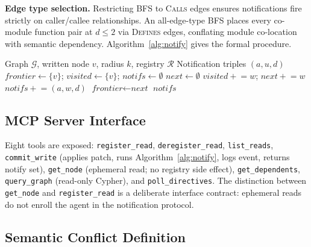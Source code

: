 \documentclass[12pt]{article}
\begin{document}
\noindent\textbf{Edge type selection.}
Restricting BFS to \textsc{Calls} edges ensures notifications fire strictly on
caller/callee relationships. An all-edge-type BFS places every co-module
function pair at $d \leq 2$ via \textsc{Defines} edges, conflating module
co-location with semantic dependency. Algorithm~\ref{alg:notify} gives the
formal procedure.

\begin{algorithm}[ht]
\caption{Write-Triggered Notification (\textsc{NotifyDependents})}
\label{alg:notify}
\small
\begin{algorithmic}[1]
\Require Graph $\mathcal{G}$, written node $v$, radius $k$, registry $\mathcal{R}$
\Ensure Notification triples $(a, u, d)$
\State $\textit{frontier} \leftarrow \{v\}$;\;
       $\textit{visited} \leftarrow \{v\}$;\;
       $\textit{notifs} \leftarrow \emptyset$
    \State $\textit{next} \leftarrow \emptyset$
            \State $\textit{visited} \mathrel{+}= w$;\; $\textit{next} \mathrel{+}= w$
                \State $\textit{notifs} \mathrel{+}= (a,w,d)$
            \EndFor
        \EndFor
    \EndFor
    \State $\textit{frontier} \leftarrow \textit{next}$
\EndFor
\State \Return $\textit{notifs}$
\end{algorithmic}
\end{algorithm}

\subsection{MCP Server Interface}

Eight tools are exposed: \texttt{register\_read}, \texttt{deregister\_read},
\texttt{list\_reads}, \texttt{commit\_write} (applies patch, runs
Algorithm~\ref{alg:notify}, logs event, returns notify set),
\texttt{get\_node} (ephemeral read; no registry side effect),
\texttt{get\_dependents}, \texttt{query\_graph} (read-only Cypher), and
\texttt{poll\_directives}. The distinction between \texttt{get\_node} and
\texttt{register\_read} is a deliberate interface contract: ephemeral reads
do not enroll the agent in the notification protocol.

\subsection{Semantic Conflict Definition}
\end{document}
